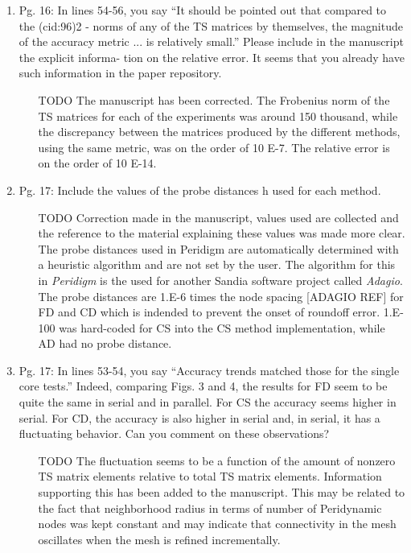\documentclass{article}
\begin{document}
\begin{enumerate}
  \item
    Pg. 16: In lines 54-56, you say “It should be pointed out that compared to the (cid:96)2 -
    norms of any of the TS matrices by themselves, the magnitude of the accuracy
    metric ... is relatively small.” Please include in the manuscript the explicit informa-
    tion on the relative error. It seems that you already have such information in the
    paper repository.

{\color{red}  
\begin{itemize}
     \item
[TODO]
    The manuscript has been corrected. 
    The Frobenius norm of the TS matrices for each of the experiments was around 150 thousand, while the discrepancy between the matrices produced by the different methods, using the same metric, was on the order of 10 E-7. The relative error is on the order of 10 E-14. 
    \end{itemize}}

  \item
    Pg. 17: Include the values of the probe distances h used for each method.

{\color{red}  
\begin{itemize}
     \item
[TODO]
    Correction made in the manuscript, values used are collected and the reference to the material explaining these values was made more clear.
    The probe distances used in Peridigm are automatically determined with a
    heuristic algorithm and are not set by the user. The algorithm for this in
    \emph{Peridigm} is the used for another Sandia software project called
    \emph{Adagio}. The probe distances are 1.E-6 times the node spacing [ADAGIO
    REF] for FD and CD which is indended to prevent the onset of roundoff error.
    1.E-100 was hard-coded for CS into the CS method implementation, while AD had no probe distance.
  \end{itemize}}

  \item
    Pg. 17: In lines 53-54, you say “Accuracy trends matched those for the single core
    tests.” Indeed, comparing Figs. 3 and 4, the results for FD seem to be quite the
    same in serial and in parallel. For CS the accuracy seems higher in serial. For CD,
    the accuracy is also higher in serial and, in serial, it has a ﬂuctuating behavior. Can
    you comment on these observations?

{\color{red}  
\begin{itemize}
     \item
[TODO]
	The fluctuation seems to be a function of the amount of nonzero TS matrix elements relative to total TS matrix elements. Information supporting this has been added to the manuscript. This may be related to the fact that neighborhood radius in terms of number of Peridynamic nodes was kept constant and may indicate that connectivity in the mesh oscillates when the mesh is refined incrementally. 
  \end{itemize}}


\end{enumerate}
\end{document}
